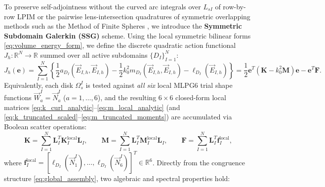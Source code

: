 \documentclass[VANCOUVER]{USG}
\begin{document}
To preserve self-adjointness without the curved arc integrals over $L_{sI}$ of row-by-row LPIM or the pairwise lens-intersection quadratures of symmetric overlapping methods such as the Method of Finite Spheres \cite{de2000method, nicomedes2017meshfree, nicomedes2021acoustic}, we introduce the \textbf{Symmetric Subdomain Galerkin (SSG)} scheme. Using the local symmetric bilinear forms \eqref{eq:volume_energy_form}, we define the discrete quadratic action functional $J_h: \mathbb{R}^N \to \mathbb{R}$ summed over all active subdomains $\{D_I\}_{I=1}^N$:
\begin{equation}
    J_h(\mathbf{e}) = \sum_{I=1}^N \left\{ \frac{1}{2} a_{D_I}(\vec{E}_{I,h}, \vec{E}_{I,h}) - \frac{1}{2} k_0^2 m_{D_I}(\vec{E}_{I,h}, \vec{E}_{I,h}) - \ell_{D_I}(\vec{E}_{I,h}) \right\} = \frac{1}{2} \mathbf{e}^T (\mathbf{K} - k_0^2 \mathbf{M}) \mathbf{e} - \mathbf{e}^T \mathbf{F}.
    \label{eq:discrete_action_functional}
\end{equation}
Equivalently, each disk $\Omega_s^I$ is tested against \textit{all six} local MLPG6 trial shape functions $\vec{W}_a^I = \vec{N}_a^I$ ($a=1,\dots,6$), and the resulting $6 \times 6$ closed-form local matrices \eqref{eq:k_curl_analytic}--\eqref{eq:m_local_analytic} (and \eqref{eq:k_truncated_scaled}--\eqref{eq:m_truncated_moments}) are accumulated via Boolean scatter operations:
\begin{equation}
    \mathbf{K} = \sum_{I=1}^N \mathbf{L}_I^T \mathbf{K}_I^{\mathrm{local}} \mathbf{L}_I, \qquad \mathbf{M} = \sum_{I=1}^N \mathbf{L}_I^T \mathbf{M}_I^{\mathrm{local}} \mathbf{L}_I, \qquad \mathbf{F} = \sum_{I=1}^N \mathbf{L}_I^T \mathbf{f}_I^{\mathrm{local}},
    \label{eq:global_assembly}
\end{equation}
where $\mathbf{f}_I^{\mathrm{local}} = [\ell_{D_I}(\vec{N}_1^I), \dots, \ell_{D_I}(\vec{N}_6^I)]^T \in \mathbb{R}^6$. Directly from the congruence structure \eqref{eq:global_assembly}, two algebraic and spectral properties hold:
\end{document}

